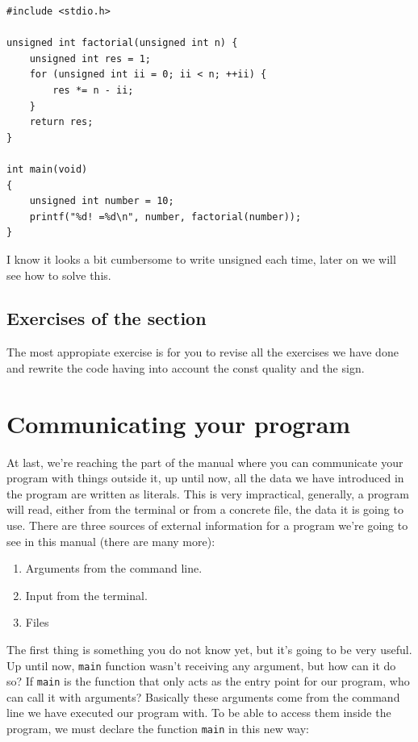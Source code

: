 \documentclass[a4paper]{article}
\begin{document}
\noindent
\begin{minipage}[H]{\linewidth}
\mbox{}
\begin{lstlisting}[style=C,
caption={Use of unsigned types},
label={lst:unsignedTypes}]
#include <stdio.h>

unsigned int factorial(unsigned int n) {
    unsigned int res = 1;
    for (unsigned int ii = 0; ii < n; ++ii) {
        res *= n - ii;
    }
    return res;
}

int main(void)
{
    unsigned int number = 10;
    printf("%d! =%d\n", number, factorial(number));
}
\end{lstlisting}
\end{minipage}

I know it looks a bit cumbersome to write unsigned each time, later on we will
see how to solve this.
\subsection{Exercises of the section}
The most appropiate exercise is for you to revise all the exercises we have done
and rewrite the code having into account the const quality and the sign.

\section{Communicating your program}
At last, we're reaching the part of the manual where you can communicate your
program with things outside it, up until now, all the data we have introduced in
the program are written as literals. This is very impractical, generally, a
program will read, either from the terminal or from a concrete file, the data
it is going to use. There are three sources of external information for a
program we're going to see in this manual (there are many more):
\begin{enumerate}
    \item Arguments from the command line.
    \item Input from the terminal.
    \item Files
\end{enumerate}

The first thing is something you do not know yet, but it's going to be very
useful. Up until now, \verb!main! function wasn't receiving any argument, but
how can it do so? If \verb!main! is the function that only acts as the entry
point for our program, who can call it with arguments? Basically these arguments
come from the command line we have executed our program with. To be able to
access them inside the program, we must declare the function \verb!main! in this
new way:
\end{document}
